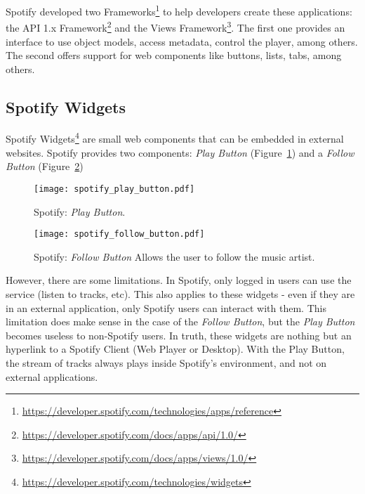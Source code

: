       Spotify developed two Frameworks\footnote{\url{https://developer.spotify.com/technologies/apps/reference}} to help developers create these applications: the API 1.x Framework\footnote{\url{https://developer.spotify.com/docs/apps/api/1.0/}} and the Views Framework\footnote{\url{https://developer.spotify.com/docs/apps/views/1.0/}}.
      The first one provides an interface to use object models, access metadata, control the player, among others.
      The second offers support for web components like buttons, lists, tabs, among others.



    \subsection{Spotify Widgets} %
    \label{sub:spotify_widgets}

      Spotify Widgets\footnote{\url{https://developer.spotify.com/technologies/widgets}} are small web components that can be embedded in external websites.
      Spotify provides two components: \emph{Play Button} (Figure~\ref{fig:spotify_play_button}) and a \emph{Follow Button} (Figure~\ref{fig:spotify_follow_button})

      \begin{figure}[H]
        \begin{center}
          \texttt{[image: spotify\_play\_button.pdf]}
        \end{center}
        \caption{Spotify: \emph{Play Button}.}
        \label{fig:spotify_play_button}
      \end{figure}

      \begin{figure}[H]
        \begin{center}
          \texttt{[image: spotify\_follow\_button.pdf]}
        \end{center}
        \caption{Spotify: \emph{Follow Button} Allows the user to follow the music artist.}
        \label{fig:spotify_follow_button}
      \end{figure}

      However, there are some limitations.
      In Spotify, only logged in users can use the service (listen to tracks, etc).
      This also applies to these widgets - even if they are in an external application, only Spotify users can interact with them.
      This limitation does make sense in the case of the \emph{Follow Button}, but the \emph{Play Button} becomes useless to non-Spotify users.
      In truth, these widgets are nothing but an hyperlink to a Spotify Client (Web Player or Desktop).
      With the Play Button, the stream of tracks always plays inside Spotify's environment, and not on external applications.

